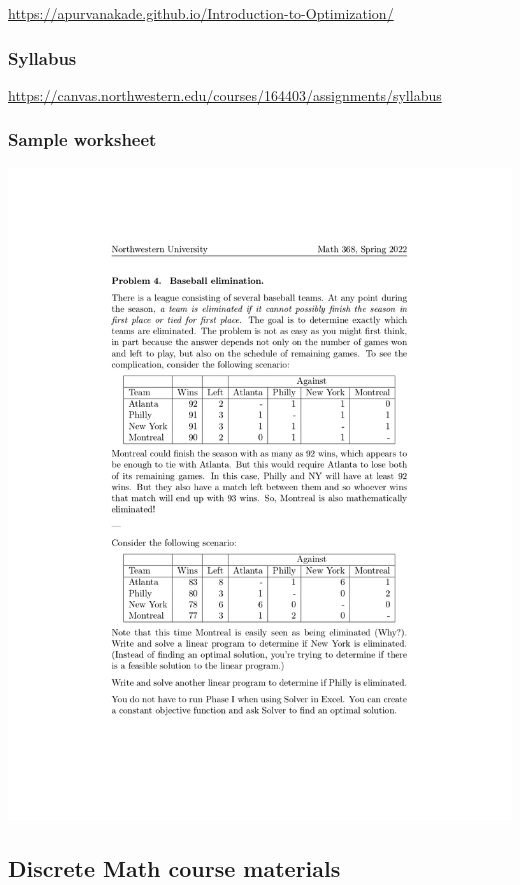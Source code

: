 \documentclass[
]{report}
\begin{document}
\url{https://apurvanakade.github.io/Introduction-to-Optimization/}

\hypertarget{syllabus}{%
\subsubsection{Syllabus}\label{syllabus}}

\url{https://canvas.northwestern.edu/courses/164403/assignments/syllabus}

\hypertarget{sample-worksheet}{%
\subsubsection{Sample worksheet}\label{sample-worksheet}}

\includegraphics{images/Math 368 Discussion Worksheet Example.jpg}

\hypertarget{discrete-math-course-materials}{%
\subsection{Discrete Math course materials}\label{discrete-math-course-materials}}
\end{document}
